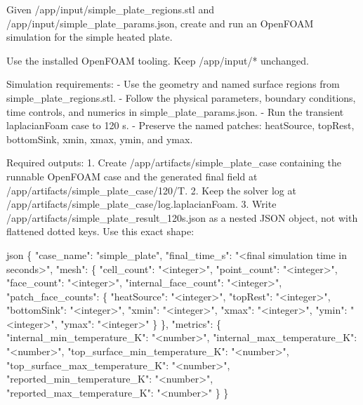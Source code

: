 \documentclass{llmxive}
\begin{document}
\begin{instructionbox}
Given \textasciigrave{}/app/input/simple\_plate\_regions.stl\textasciigrave{} and \textasciigrave{}/app/input/simple\_plate\_params.json\textasciigrave{}, create and run an OpenFOAM simulation for the simple heated plate.

Use the installed OpenFOAM tooling. Keep \textasciigrave{}/app/input/*\textasciigrave{} unchanged.

Simulation requirements:
- Use the geometry and named surface regions from \textasciigrave{}simple\_plate\_regions.stl\textasciigrave{}.
- Follow the physical parameters, boundary conditions, time controls, and numerics in \textasciigrave{}simple\_plate\_params.json\textasciigrave{}.
- Run the transient \textasciigrave{}laplacianFoam\textasciigrave{} case to \textasciigrave{}120 s\textasciigrave{}.
- Preserve the named patches: \textasciigrave{}heatSource\textasciigrave{}, \textasciigrave{}topRest\textasciigrave{}, \textasciigrave{}bottomSink\textasciigrave{}, \textasciigrave{}xmin\textasciigrave{}, \textasciigrave{}xmax\textasciigrave{}, \textasciigrave{}ymin\textasciigrave{}, and \textasciigrave{}ymax\textasciigrave{}.

Required outputs:
1. Create \textasciigrave{}/app/artifacts/simple\_plate\_case\textasciigrave{} containing the runnable OpenFOAM case and the generated final field at \textasciigrave{}/app/artifacts/simple\_plate\_case/120/T\textasciigrave{}.
2. Keep the solver log at \textasciigrave{}/app/artifacts/simple\_plate\_case/log.laplacianFoam\textasciigrave{}.
3. Write \textasciigrave{}/app/artifacts/simple\_plate\_result\_120s.json\textasciigrave{} as a nested JSON object, not with flattened dotted keys. Use this exact shape:

\textasciigrave{}\textasciigrave{}\textasciigrave{}json
\{
  "case\_name": "simple\_plate",
  "final\_time\_s": "\textless{}final simulation time in seconds\textgreater{}",
  "mesh": \{
    "cell\_count": "\textless{}integer\textgreater{}",
    "point\_count": "\textless{}integer\textgreater{}",
    "face\_count": "\textless{}integer\textgreater{}",
    "internal\_face\_count": "\textless{}integer\textgreater{}",
    "patch\_face\_counts": \{
      "heatSource": "\textless{}integer\textgreater{}",
      "topRest": "\textless{}integer\textgreater{}",
      "bottomSink": "\textless{}integer\textgreater{}",
      "xmin": "\textless{}integer\textgreater{}",
      "xmax": "\textless{}integer\textgreater{}",
      "ymin": "\textless{}integer\textgreater{}",
      "ymax": "\textless{}integer\textgreater{}"
    \}
  \},
  "metrics": \{
    "internal\_min\_temperature\_K": "\textless{}number\textgreater{}",
    "internal\_max\_temperature\_K": "\textless{}number\textgreater{}",
    "top\_surface\_min\_temperature\_K": "\textless{}number\textgreater{}",
    "top\_surface\_max\_temperature\_K": "\textless{}number\textgreater{}",
    "reported\_min\_temperature\_K": "\textless{}number\textgreater{}",
    "reported\_max\_temperature\_K": "\textless{}number\textgreater{}"
  \}
\}
\textasciigrave{}\textasciigrave{}\textasciigrave{}


\end{instructionbox}
\end{document}

